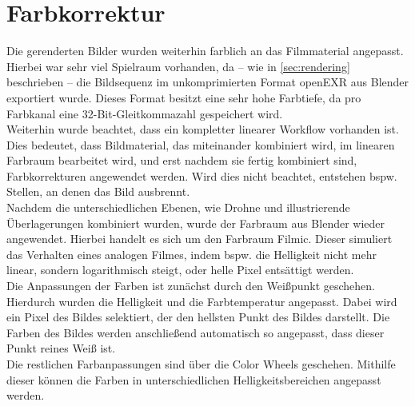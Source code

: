 
\section{Farbkorrektur}

Die gerenderten Bilder wurden weiterhin farblich an das Filmmaterial angepasst. Hierbei war sehr viel Spielraum vorhanden, da -- wie in \autoref{sec:rendering} beschrieben -- die Bildsequenz im unkomprimierten Format openEXR aus Blender exportiert wurde. Dieses Format besitzt eine sehr hohe Farbtiefe, da pro Farbkanal eine 32-Bit-Gleitkommazahl gespeichert wird. \\
Weiterhin wurde beachtet, dass ein kompletter linearer Workflow vorhanden ist. Dies bedeutet, dass Bildmaterial, das miteinander kombiniert wird, im linearen Farbraum bearbeitet wird, und erst nachdem sie fertig kombiniert sind, Farbkorrekturen angewendet werden. Wird dies nicht beachtet, entstehen bspw. Stellen, an denen das Bild ausbrennt. \\
Nachdem die unterschiedlichen Ebenen, wie Drohne und illustrierende Überlagerungen kombiniert wurden, wurde der Farbraum aus Blender wieder angewendet. Hierbei handelt es sich um den Farbraum Filmic. Dieser simuliert das Verhalten eines analogen Filmes, indem bspw. die Helligkeit nicht mehr linear, sondern logarithmisch steigt, oder helle Pixel entsättigt werden. \\
Die Anpassungen der Farben ist zunächst durch den Weißpunkt geschehen. Hierdurch wurden die Helligkeit und die Farbtemperatur angepasst. Dabei wird ein Pixel des Bildes selektiert, der den hellsten Punkt des Bildes darstellt. Die Farben des Bildes werden anschließend automatisch so angepasst, dass dieser Punkt reines Weiß ist.\\
Die restlichen Farbanpassungen sind über die Color Wheels geschehen. Mithilfe dieser können die Farben in unterschiedlichen Helligkeitsbereichen angepasst werden. 


